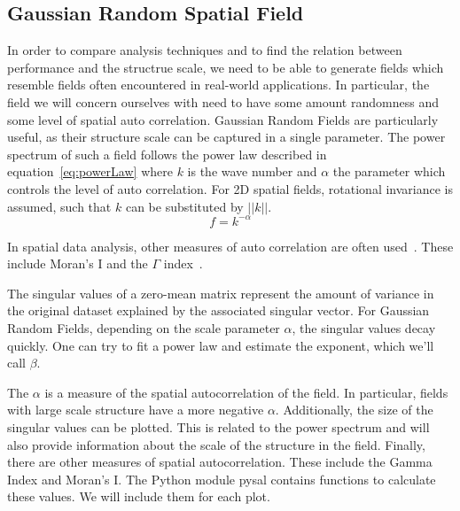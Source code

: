 \documentclass{acm_proc_article-sp}
\begin{document}
\subsection{Gaussian Random Spatial Field}
\label{sec:Introduction Gaussian Random Spatial Field}

In order to compare analysis techniques and to find the relation between performance and the structrue scale, we need to be able to generate fields which resemble fields often encountered in real-world applications. In particular, the field we will concern ourselves with need to have some amount randomness and some level of spatial auto correlation. Gaussian Random Fields are particularly useful, as their structure scale can be captured in a single parameter. The power spectrum of such a field follows the power law described in equation~\ref{eq:powerLaw} where $k$ is the wave number and $\alpha$ the parameter which controls the level of auto correlation. For 2D spatial fields, rotational invariance is assumed, such that $k$ can be substituted by $||k||$.
\begin{equation}
\label{eq:powerLaw}
f = k^{-\alpha}
\end{equation}

In spatial data analysis, other measures of auto correlation are often used~\cite{Eshel2011, Storch1999}. These include Moran's I and the $\Gamma$ index~\cite{Moran1950, Hubert1981, PySAL}.

The singular values of a zero-mean matrix represent the amount of variance in the original dataset explained by the associated singular vector. For Gaussian Random Fields, depending on the scale parameter $\alpha$, the singular values decay quickly. One can try to fit a power law and estimate the exponent, which we'll call $\beta$. 

The $\alpha$ is a measure of the spatial autocorrelation of the field. In particular, fields with large scale structure have a more negative $\alpha$. Additionally, the size of the singular values can be plotted. This is related to the power spectrum and will also provide information about the scale of the structure in the field. Finally, there are other measures of spatial autocorrelation. These include the Gamma Index and Moran's I. The Python module pysal contains functions to calculate these values. We will include them for each plot.
\end{document}
